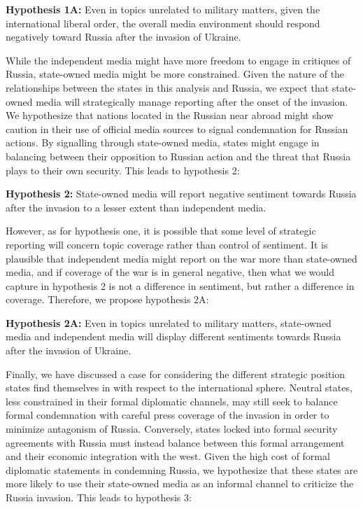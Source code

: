 \documentclass[12pt]{article}
\begin{document}
\textbf{Hypothesis 1A:} Even in topics unrelated to military matters, given the international liberal order, the overall media environment should respond negatively toward Russia after the invasion of Ukraine. 

While the independent media might have more freedom to engage in critiques of Russia, state-owned media might be more constrained. Given the nature of the relationships between the states in this analysis and Russia, we expect that state-owned media will strategically manage reporting after the onset of the invasion. We hypothesize that nations located in the Russian near abroad might show caution in their use of official media sources to signal condemnation for Russian actions. By signalling through state-owned media, states might engage in balancing between their opposition to Russian action and the threat that Russia plays to their own security. This leads to hypothesis 2:

\textbf{Hypothesis 2:} State-owned media will report negative sentiment towards Russia after the invasion to a lesser extent than independent media.

However, as for hypothesis one, it is possible that some level of strategic reporting will concern topic coverage rather than control of sentiment. It is plausible that independent media might report on the war more than state-owned media, and if coverage of the war is in general negative, then what we would capture in hypothesis 2 is not a difference in sentiment, but rather a difference in coverage. Therefore, we propose hypothesis 2A:

\textbf{Hypothesis 2A:} Even in topics unrelated to military matters, state-owned media and independent media will display different sentiments towards Russia after the invasion of Ukraine. 

Finally, we have discussed a case for considering the different strategic position states find themselves in with respect to the international sphere. Neutral states, less constrained in their formal diplomatic channels, may still seek to balance formal condemnation with careful press coverage of the invasion in order to minimize antagonism of Russia. Conversely, states locked into formal security agreements with Russia must instead balance between this formal arrangement and their economic integration with the west. Given the high cost of formal diplomatic statements in condemning Russia, we hypothesize that these states are more likely to use their state-owned media as an informal channel to criticize the Russia invasion. This leads to hypothesis 3:
\end{document}

